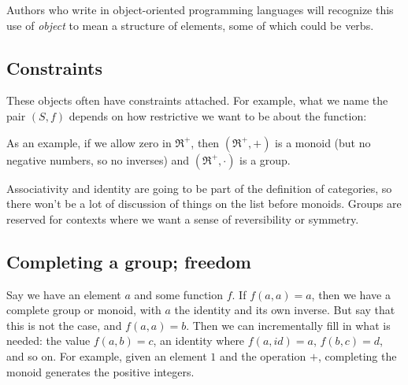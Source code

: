 \documentclass[11pt]{article}
\begin{document}

Authors who write in object-oriented programming languages will recognize this
use of {\em object} to mean a structure of elements, some of which could be verbs.

\subsection{Constraints}
These objects often have constraints attached. For example, what we name the pair $(S, f)$ depends on
how restrictive we want to be about the function:


As an example, if we allow zero in $\Re^+$, then $(\Re^+, +)$ is a monoid (but no
negative numbers, so no inverses) and $(\Re^+, \cdot)$ is a group.

Associativity and identity are going to be part of the definition of categories,
so there won't be a lot of discussion of things on the list before monoids.
Groups are reserved for contexts where we want a sense of reversibility or symmetry.

\subsection{Completing a group; freedom} Say we have an element $a$ and some function $f$. If
$f(a,a)=a$, then we have a complete group or monoid, with $a$ the identity and its own
inverse.  But say that this is not the case, and $f(a,a)=b$. Then we can incrementally fill in what is
needed: the value $f(a,b)=c$, an identity where $f(a, id)=a$, $f(b,c)=d$, and so on. 
For example, given an element $1$ and the operation $+$, completing the monoid generates
the positive integers.
\end{document}

